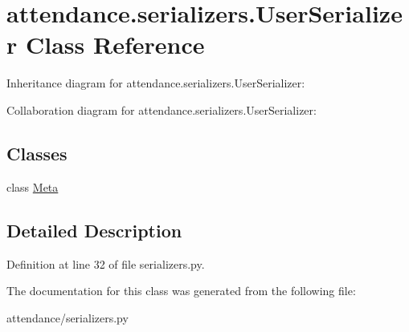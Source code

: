 \hypertarget{classattendance_1_1serializers_1_1_user_serializer}{}\section{attendance.\+serializers.\+User\+Serializer Class Reference}
\label{classattendance_1_1serializers_1_1_user_serializer}


Inheritance diagram for attendance.\+serializers.\+User\+Serializer\+:


Collaboration diagram for attendance.\+serializers.\+User\+Serializer\+:
\subsection*{Classes}
\begin{DoxyCompactItemize}
\item 
class \hyperlink{classattendance_1_1serializers_1_1_user_serializer_1_1_meta}{Meta}
\end{DoxyCompactItemize}


\subsection{Detailed Description}


Definition at line 32 of file serializers.\+py.



The documentation for this class was generated from the following file\+:\begin{DoxyCompactItemize}
\item 
attendance/serializers.\+py\end{DoxyCompactItemize}
